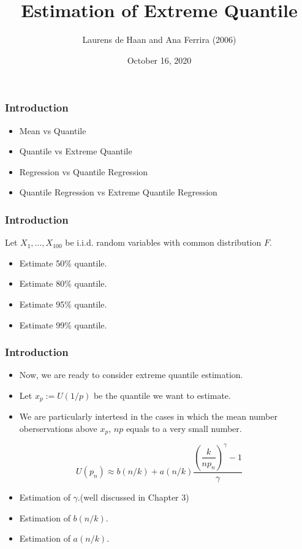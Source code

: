 \documentclass{beamer}
\title{Estimation of Extreme Quantile}
\author{Laurens de Haan and Ana Ferrira (2006)}
\date{October 16, 2020}
\begin{document}
 

\begin{frame}
    \titlepage
\end{frame}


\begin{frame}
    \frametitle{Introduction}
\begin{itemize}
    \item Mean vs Quantile
    \item Quantile vs Extreme Quantile
    \item Regression vs Quantile Regression
    \item Quantile Regression vs Extreme Quantile Regression
\end{itemize}
\end{frame}

\begin{frame}
    \frametitle{Introduction}
    Let $X_1,\dots,X_{100}$ be i.i.d. random variables with common distribution $F$.

    \begin{itemize}
        \item Estimate 50\% quantile.
        \item Estimate 80\% quantile.
        \item Estimate 95\% quantile.
        \item Estimate 99\% quantile.
    \end{itemize}
    

\end{frame}

\begin{frame}
    \frametitle{Introduction}
    \begin{itemize}
        \item Now, we are ready to consider extreme quantile estimation. 
        \item Let $x_p:=U(1/p)$  be the quantile we want to estimate. 
        \item     We are particularly intertesd in the cases in which the mean number oberservations above $x_p$, $np$ equals to a very small number.
    \end{itemize}

$$
U(p_n) \approx b(n/k)+a(n/k)\dfrac{\left(\dfrac{k}{np_n}\right)^{\gamma}-1}{\gamma}
$$
\begin{itemize}
    \item Estimation of $\gamma$.(well discussed in Chapter 3)
    \item Estimation of $b(n/k)$. 
    \item Estimation of $a(n/k)$.
\end{itemize}
    

\end{frame}
\end{document}
